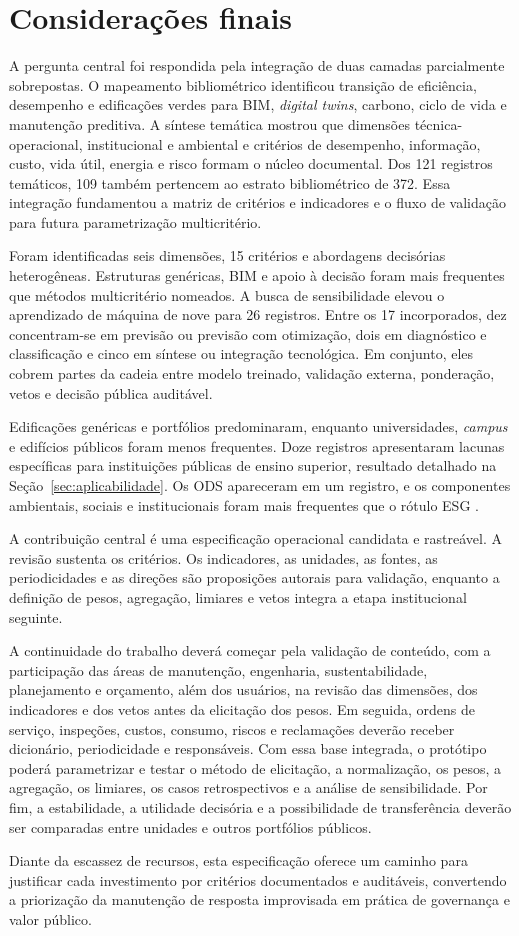 \section{Considerações finais}
\label{sec:consideracoes}

A pergunta central foi respondida pela integração de duas camadas parcialmente sobrepostas. O mapeamento bibliométrico identificou transição de eficiência, desempenho e edificações verdes para BIM, \textit{digital twins}, carbono, ciclo de vida e manutenção preditiva. A síntese temática mostrou que dimensões técnica-operacional, institucional e ambiental e critérios de desempenho, informação, custo, vida útil, energia e risco formam o núcleo documental. Dos 121 registros temáticos, 109 também pertencem ao estrato bibliométrico de 372. Essa integração fundamentou a matriz de critérios e indicadores e o fluxo de validação para futura parametrização multicritério.

Foram identificadas seis dimensões, 15 critérios e abordagens decisórias heterogêneas. Estruturas genéricas, BIM e apoio à decisão foram mais frequentes que métodos multicritério nomeados. A busca de sensibilidade elevou o aprendizado de máquina de nove para 26 registros. Entre os 17 incorporados, dez concentram-se em previsão ou previsão com otimização, dois em diagnóstico e classificação e cinco em síntese ou integração tecnológica. Em conjunto, eles cobrem partes da cadeia entre modelo treinado, validação externa, ponderação, vetos e decisão pública auditável.

Edificações genéricas e portfólios predominaram, enquanto universidades, \textit{campus} e edifícios públicos foram menos frequentes. Doze registros apresentaram lacunas específicas para instituições públicas de ensino superior, resultado detalhado na Seção~\ref{sec:aplicabilidade}. Os ODS apareceram em um registro, e os componentes ambientais, sociais e institucionais foram mais frequentes que o rótulo ESG \parencite{masmoudi_ahptopsis_2026,ramantswana_esgfm_2026}.

A contribuição central é uma especificação operacional candidata e rastreável. A revisão sustenta os critérios. Os indicadores, as unidades, as fontes, as periodicidades e as direções são proposições autorais para validação, enquanto a definição de pesos, agregação, limiares e vetos integra a etapa institucional seguinte.

A continuidade do trabalho deverá começar pela validação de conteúdo, com a participação das áreas de manutenção, engenharia, sustentabilidade, planejamento e orçamento, além dos usuários, na revisão das dimensões, dos indicadores e dos vetos antes da elicitação dos pesos. Em seguida, ordens de serviço, inspeções, custos, consumo, riscos e reclamações deverão receber dicionário, periodicidade e responsáveis. Com essa base integrada, o protótipo poderá parametrizar e testar o método de elicitação, a normalização, os pesos, a agregação, os limiares, os casos retrospectivos e a análise de sensibilidade. Por fim, a estabilidade, a utilidade decisória e a possibilidade de transferência deverão ser comparadas entre unidades e outros portfólios públicos.

Diante da escassez de recursos, esta especificação oferece um caminho para justificar cada investimento por critérios documentados e auditáveis, convertendo a priorização da manutenção de resposta improvisada em prática de governança e valor público.
